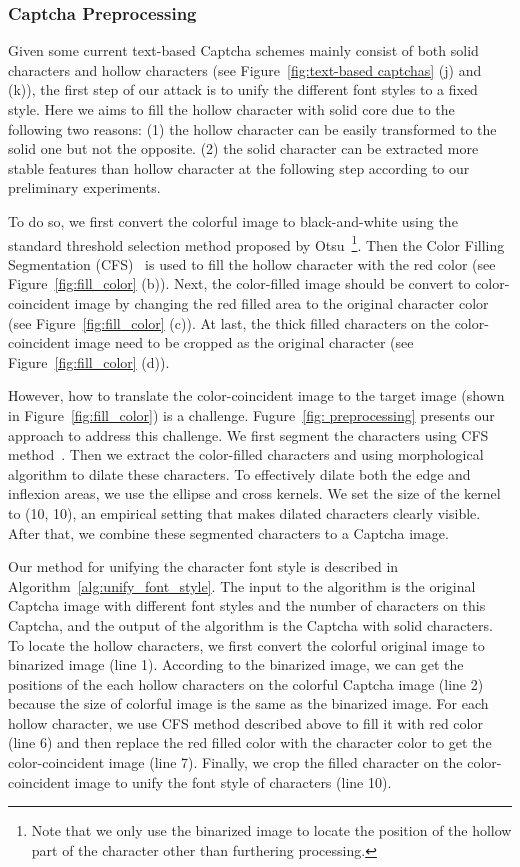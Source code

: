 \subsubsection{Captcha Preprocessing}
Given some current text-based Captcha schemes mainly consist of both solid characters and hollow characters (see Figure~\ref{fig:text-based captchas} (j) and (k)), the first step of our attack is to unify the different font styles to a fixed style. Here we aims to fill the hollow character with solid core due to the following two reasons:
(1) the hollow character can be easily transformed to the solid one but not the opposite.
(2) the solid character can be extracted more stable features than hollow character at the following step according to our preliminary experiments.

To do so, we first convert the colorful image to black-and-white using the standard threshold selection method proposed by Otsu~\cite{Ostu1979A}\footnote{Note that we only use the binarized image to locate the position of the hollow part of the character other than furthering processing.}.
Then the Color Filling Segmentation (CFS)~\cite{Yan2008A} is used to fill the hollow character with the red color (see Figure~\ref{fig:fill_color} (b)). Next, the color-filled image should be convert to color-coincident image by changing the red filled area to the original character color (see Figure~\ref{fig:fill_color} (c)). At last, the thick filled characters on the color-coincident image need to be cropped as the original character (see Figure~\ref{fig:fill_color} (d)).

However, how to translate the color-coincident image to the target image (shown in Figure~\ref{fig:fill_color}) is a challenge. Fugure~\ref{fig: preprocessing} presents our approach to address this challenge. We first segment the characters using CFS method~\cite{Yan2008A}.  Then we extract the color-filled characters and using morphological algorithm to dilate these characters. To effectively dilate both the edge and inflexion areas, we use the ellipse and cross kernels. We set the size of the kernel to (10, 10), an empirical setting that makes dilated characters clearly visible. After that, we combine these segmented characters to a Captcha image.

Our method for unifying the character font style is described in Algorithm~\ref{alg:unify_font_style}.
The input to the algorithm is the original Captcha image with different font styles and the number of characters on this Captcha, and the output of the algorithm is the Captcha with solid characters. To locate the hollow characters, we first convert the colorful original image to binarized image (line 1). According to the binarized image, we can get the positions of the each hollow characters on the colorful Captcha image (line 2) because the size of colorful image is the same as the binarized image. For each hollow character, we use CFS method described above to fill it with red color (line 6) and then replace the red filled color with the character color to get the color-coincident image (line 7). Finally, we crop the filled character on the color-coincident image to unify the font style of characters (line 10).

